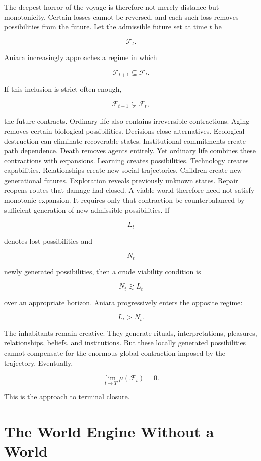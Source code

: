 \documentclass[11pt,oneside]{book}
\theoremstyle{definition}
\theoremstyle{remark}
\begin{document}
The deepest horror of the voyage is therefore not merely distance but monotonicity. Certain losses
cannot be reversed, and each such loss removes possibilities from the future. Let the admissible
future set at time \(t\) be

\[
\mathcal{F}_t.
\]

Aniara increasingly approaches a regime in which

\[
\mathcal{F}_{t+1}\subseteq\mathcal{F}_t.
\]

If this inclusion is strict often enough,

\[
\mathcal{F}_{t+1}\subsetneq\mathcal{F}_t,
\]

the future contracts. Ordinary life also contains irreversible contractions. Aging removes certain
biological possibilities. Decisions close alternatives. Ecological destruction can eliminate
recoverable states. Institutional commitments create path dependence. Death removes agents entirely.
Yet ordinary life combines these contractions with expansions. Learning creates possibilities.
Technology creates capabilities. Relationships create new social trajectories. Children create new
generational futures. Exploration reveals previously unknown states. Repair reopens routes that
damage had closed. A viable world therefore need not satisfy monotonic expansion. It requires only
that contraction be counterbalanced by sufficient generation of new admissible possibilities. If

\[
L_t
\]

denotes lost possibilities and

\[
N_t
\]

newly generated possibilities, then a crude viability condition is

\[
N_t\gtrsim L_t
\]

over an appropriate horizon. Aniara progressively enters the opposite regime:

\[
L_t>N_t.
\]

The inhabitants remain creative. They generate rituals, interpretations, pleasures, relationships,
beliefs, and institutions. But these locally generated possibilities cannot compensate for the
enormous global contraction imposed by the trajectory. Eventually,

\[
\lim_{t\to T} \mu(\mathcal{F}_t)=0.
\]

This is the approach to terminal closure.

\section{The World Engine Without a World}
\end{document}
